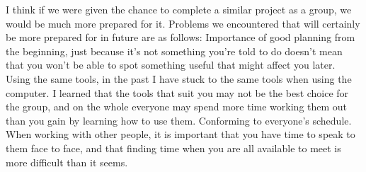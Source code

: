\documentclass[titlepage]{article}
\begin{document}
{{I think if we were given the chance to complete a similar project as a group, we would be much more prepared for it. Problems we encountered that will certainly be more prepared for in future are as follows: Importance of good planning from the beginning, just because it's not something you're told to do doesn't mean that you won't be able to spot something useful that might affect you later. Using the same tools, in the past I have stuck to the same tools when using the computer. I learned that the tools that suit you may not be the best choice for the group, and on the whole everyone may spend more time working them out than you gain by learning how to use them. Conforming to everyone's schedule. When working with other people, it is important that you have time to speak to them face to face, and that finding time when you are all available to meet is more difficult than it seems.}

}
\end{document}
